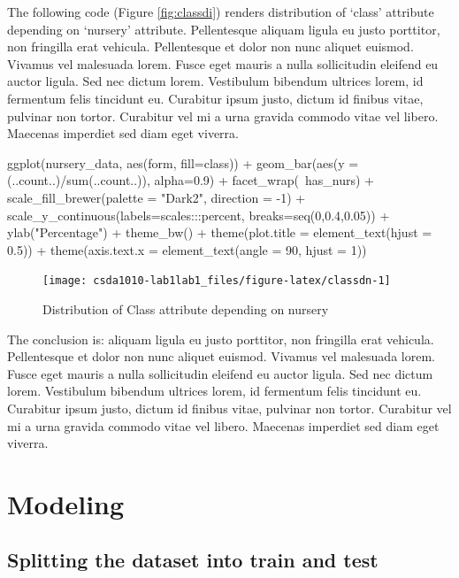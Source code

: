 The following code (Figure \ref{fig:classdi}) renders distribution of
`class' attribute depending on `nursery' attribute. Pellentesque aliquam
ligula eu justo porttitor, non fringilla erat vehicula. Pellentesque et
dolor non nunc aliquet euismod. Vivamus vel malesuada lorem. Fusce eget
mauris a nulla sollicitudin eleifend eu auctor ligula. Sed nec dictum
lorem. Vestibulum bibendum ultrices lorem, id fermentum felis tincidunt
eu. Curabitur ipsum justo, dictum id finibus vitae, pulvinar non tortor.
Curabitur vel mi a urna gravida commodo vitae vel libero. Maecenas
imperdiet sed diam eget viverra.

\begin{Schunk}
\begin{Sinput}
ggplot(nursery_data, aes(form, fill=class)) + 
  geom_bar(aes(y = (..count..)/sum(..count..)), alpha=0.9) +
  facet_wrap(~has_nurs) + 
  scale_fill_brewer(palette = "Dark2", direction = -1) +
  scale_y_continuous(labels=scales:::percent, breaks=seq(0,0.4,0.05)) +
  ylab("Percentage") +
  theme_bw() +
  theme(plot.title = element_text(hjust = 0.5)) +
  theme(axis.text.x = element_text(angle = 90, hjust = 1))
\end{Sinput}
\begin{figure}

{\centering \texttt{[image: csda1010-lab1lab1\_files/figure-latex/classdn-1]} 

}

\caption[Distribution of Class attribute depending on nursery]{Distribution of Class attribute depending on nursery}\label{fig:classdn}
\end{figure}
\end{Schunk}

The conclusion is: aliquam ligula eu justo porttitor, non fringilla erat
vehicula. Pellentesque et dolor non nunc aliquet euismod. Vivamus vel
malesuada lorem. Fusce eget mauris a nulla sollicitudin eleifend eu
auctor ligula. Sed nec dictum lorem. Vestibulum bibendum ultrices lorem,
id fermentum felis tincidunt eu. Curabitur ipsum justo, dictum id
finibus vitae, pulvinar non tortor. Curabitur vel mi a urna gravida
commodo vitae vel libero. Maecenas imperdiet sed diam eget viverra.

\hypertarget{modeling}{%
\section{Modeling}\label{modeling}}

\hypertarget{splitting-the-dataset-into-train-and-test}{%
\subsection{Splitting the dataset into train and
test}\label{splitting-the-dataset-into-train-and-test}}

